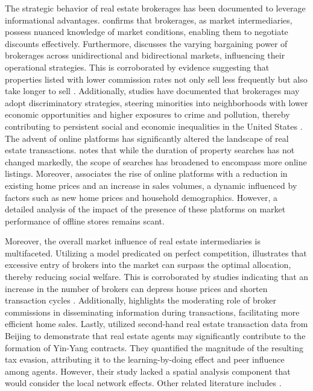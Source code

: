 \documentclass[11pt]{article}
\begin{document}
The strategic behavior of real estate brokerages has been documented to leverage informational advantages. \citet{AGARWAL2019715} confirms that brokerages, as market intermediaries, possess nuanced knowledge of market conditions, enabling them to negotiate discounts effectively. Furthermore, \citet{HAN2015813} discusses the varying bargaining power of brokerages across unidirectional and bidirectional markets, influencing their operational strategies. This is corroborated by evidence suggesting that properties listed with lower commission rates not only sell less frequently but also take longer to sell \citep{10.1257/app.20160214}. Additionally, studies have documented that brokerages may adopt discriminatory strategies, steering minorities into neighborhoods with lower economic opportunities and higher exposures to crime and pollution, thereby contributing to persistent social and economic inequalities in the United States \citep{RePEc:ucp:jpolec:doi:10.1086/720140}. The advent of online platforms has significantly altered the landscape of real estate transactions. \citet{ZUMPANO2003134} notes that while the duration of property searches has not changed markedly, the scope of searches has broadened to encompass more online listings. Moreover, \citet{ZHANG2021101104} associates the rise of online platforms with a reduction in existing home prices and an increase in sales volumes, a dynamic influenced by factors such as new home prices and household demographics. However, a detailed analysis of the impact of the presence of these platforms on market performance of offline stores remains scant.

Moreover, the overall market influence of real estate intermediaries is multifaceted. Utilizing a model predicated on perfect competition, \citet{williams_agency_1998} illustrates that excessive entry of brokers into the market can surpass the optimal allocation, thereby reducing social welfare. This is corroborated by studies indicating that an increase in the number of brokers can depress house prices and shorten transaction cycles \citep{https://doi.org/10.1002/jae.2891}. Additionally, \citet{qu_identifying_2021} highlights the moderating role of broker commissions in disseminating information during transactions, facilitating more efficient home sales. Lastly, \citet{AGARWAL2024103668} utilized second-hand real estate transaction data from Beijing to demonstrate that real estate agents may significantly contribute to the formation of Yin-Yang contracts. They quantified the magnitude of the resulting tax evasion, attributing it to the learning-by-doing effect and peer influence among agents. However, their study lacked a spatial analysis component that would consider the local network effects. Other related literature includes \citep{doi:10.1080/10527001.2021.2016340, d082a2db-5cce-33f2-87c4-9cb020cc6666, doi:10.1080/10835547.1996.12090852}.
\end{document}

